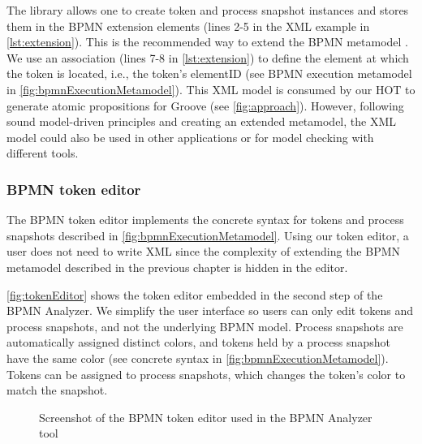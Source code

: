 \documentclass{lmcs} %
\begin{document}
The library allows one to create token and process snapshot instances and stores them in the BPMN extension elements (lines 2-5 in the XML example in \autoref{lst:extension}).
This is the recommended way to extend the BPMN metamodel \cite{objectmanagementgroupBusinessProcessModel2013}.
We use an association (lines 7-8 in \autoref{lst:extension}) to define the element at which the token is located, i.e., the token's \textsf{elementID} (see BPMN execution metamodel in \autoref{fig:bpmnExecutionMetamodel}).
This XML model is consumed by our HOT to generate atomic propositions for Groove (see \autoref{fig:approach}).
However, following sound model-driven principles and creating an extended metamodel, the XML model could also be used in other applications or for model checking with different tools.

\subsubsection{BPMN token editor}
The BPMN token editor implements the concrete syntax for tokens and process snapshots described in \autoref{fig:bpmnExecutionMetamodel}.
Using our token editor, a user does not need to write XML since the complexity of extending the BPMN metamodel described in the previous chapter is hidden in the editor.

\autoref{fig:tokenEditor} shows the token editor embedded in the second step of the BPMN Analyzer.
We simplify the user interface so users can only edit tokens and process snapshots, and not the underlying BPMN model.
Process snapshots are automatically assigned distinct colors, and tokens held by a process snapshot have the same color (see concrete syntax in \autoref{fig:bpmnExecutionMetamodel}).
Tokens can be assigned to process snapshots, which changes the token's color to match the snapshot.

\begin{figure}[ht]
    \centering
    \caption{Screenshot of the BPMN token editor used in the BPMN Analyzer tool}
    \label{fig:tokenEditor}
\end{figure}
\end{document}
